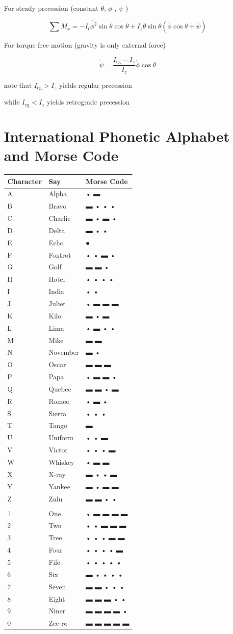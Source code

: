 \documentclass[
]{book}
\begin{document}
For steady precession (constant \(\dot{\theta}\), \(\dot{\phi}\) , \(\dot{\psi}\) )

\[ \sum M_{x} = - I_{t}\dot{\phi^{2}}\sin\theta\cos\theta + I_{z}\dot{\theta}\sin\theta\left( \dot{\phi}\cos\theta + \dot{\psi} \right) \]

For torque free motion (gravity is only external force)

\[\dot{\psi} = \frac{I_{\mathrm{cg}} - I_{z}}{I_{z}}\dot{\phi}\cos\theta\]

note that \(I_{\mathrm{cg}} > I_z\) yields regular precession

while \(I_{\mathrm{cg}} < I_z\) yields retrograde precession

\hypertarget{international-phonetic-alphabet-and-morse-code}{%
\section{International Phonetic Alphabet and Morse Code}\label{international-phonetic-alphabet-and-morse-code}}

\begin{longtable}[]{@{}lll@{}}
\toprule
Character & Say & Morse Code\tabularnewline
\midrule
\endhead
A & Alpha & • ▬\tabularnewline
B & Bravo & ▬ • • •\tabularnewline
C & Charlie & ▬ • ▬ •\tabularnewline
D & Delta & ▬ • •\tabularnewline
E & Echo & ●\tabularnewline
F & Foxtrot & • • ▬ •\tabularnewline
G & Golf & ▬ ▬ •\tabularnewline
H & Hotel & • • • •\tabularnewline
I & India & • •\tabularnewline
J & Juliet & • ▬ ▬ ▬\tabularnewline
K & Kilo & ▬ • ▬\tabularnewline
L & Lima & • ▬ • •\tabularnewline
M & Mike & ▬ ▬\tabularnewline
N & November & ▬ •\tabularnewline
O & Oscar & ▬ ▬ ▬\tabularnewline
P & Papa & • ▬ ▬ •\tabularnewline
Q & Quebec & ▬ ▬ • ▬\tabularnewline
R & Romeo & • ▬ •\tabularnewline
S & Sierra & • • •\tabularnewline
T & Tango & ▬\tabularnewline
U & Uniform & • • ▬\tabularnewline
V & Victor & • • • ▬\tabularnewline
W & Whiskey & • ▬ ▬\tabularnewline
X & X-ray & ▬ • • ▬\tabularnewline
Y & Yankee & ▬ • ▬ ▬\tabularnewline
Z & Zulu & ▬ ▬ • •\tabularnewline
& &\tabularnewline
1 & One & • ▬ ▬ ▬ ▬\tabularnewline
2 & Two & • • ▬ ▬ ▬\tabularnewline
3 & Tree & • • • ▬ ▬\tabularnewline
4 & Four & • • • • ▬\tabularnewline
5 & Fife & • • • • •\tabularnewline
6 & Six & ▬ • • • •\tabularnewline
7 & Seven & ▬ ▬ • • •\tabularnewline
8 & Eight & ▬ ▬ ▬ • •\tabularnewline
9 & Niner & ▬ ▬ ▬ ▬ •\tabularnewline
0 & Zee-ro & ▬ ▬ ▬ ▬ ▬\tabularnewline
\bottomrule
\end{longtable}
\end{document}

